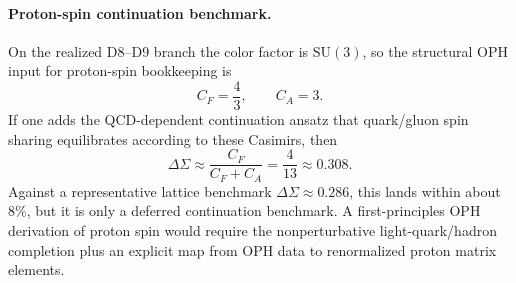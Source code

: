 \paragraph{Proton-spin continuation benchmark.}
On the realized D8--D9 branch the color factor is \(\mathrm{SU}(3)\), so the structural OPH
input for proton-spin bookkeeping is
\[
C_F=\frac43,
\qquad
C_A=3.
\]
If one adds the QCD-dependent continuation ansatz that quark/gluon spin sharing equilibrates
according to these Casimirs, then
\[
\Delta\Sigma\approx \frac{C_F}{C_F+C_A}=\frac{4}{13}\approx 0.308.
\]
Against a representative lattice benchmark \(\Delta\Sigma\approx 0.286\), this lands within about
\(8\%\), but it is only a deferred continuation benchmark. A first-principles OPH derivation of
proton spin would require the nonperturbative light-quark/hadron completion plus an explicit map
from OPH data to renormalized proton matrix elements.

